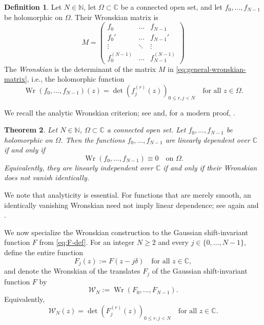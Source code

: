 \documentclass[11pt]{amsart}
\numberwithin{equation}{section}
\newtheorem{theorem}{Theorem}[section]
\theoremstyle{definition}
\newtheorem{definition}[theorem]{Definition}
\theoremstyle{remark}
\newcommand{\C}{\mathbb C}
\newcommand{\N}{\mathbb N}
\newcommand{\cW}{\mathcal W}
\newcommand{\Wr}{\operatorname{Wr}}
\begin{document}
\begin{definition}
    Let $N \in \N$, let $\Omega\subset\C$ be a connected open set, and let $f_0,\ldots,f_{N-1}$ be holomorphic on $\Omega$. Their Wronskian matrix is
    \begin{equation}\label{eq:general-wronskian-matrix}
        M = \begin{pmatrix}
            f_0 & \ldots & f_{N-1}\\
            f_0' & \ldots & f_{N-1}'\\
            \vdots & \ddots & \vdots\\
            f_0^{(N-1)} & \ldots & f_{N-1}^{(N-1)}
        \end{pmatrix}
    \end{equation}
    The \emph{Wronskian} is the determinant of the matrix $M$ in \eqref{eq:general-wronskian-matrix}, i.e., the holomorphic function
    \begin{equation}\label{eq:general-wronskian}
        \Wr(f_0,\ldots,f_{N-1})(z)
        =\det\left(f_j^{(r)}(z)\right)_{0\leq r,j<N}
        \quad\text{for all }z\in\Omega.
    \end{equation}
\end{definition}

We recall the analytic Wronskian criterion; see \cite[\S~4]{Bocher} and, for a modern proof, \cite{BostanDumas}.
\begin{theorem}\label{thm:wronskian-criterion}
    Let $N \in \N$, $\Omega\subset\C$ a connected open set. Let $f_0,\ldots,f_{N-1}$ be holomorphic on $\Omega$. Then the functions $f_0,\ldots,f_{N-1}$ are linearly dependent over $\C$ if and only if
    \begin{equation}
        \Wr(f_0,\ldots,f_{N-1})\equiv0
        \quad\text{on }\Omega.
    \end{equation}
    Equivalently, they are linearly independent over $\C$ if and only if their Wronskian does not vanish identically.
\end{theorem}
We note that analyticity is essential. For functions that are merely smooth, an identically vanishing Wronskian need not imply linear dependence; see again \cite[\S~4]{Bocher} and \cite{BostanDumas}.

We now specialize the Wronskian construction to the Gaussian shift-invariant function $F$ from \eqref{eq:F-def}. For an integer $N\geq2$ and every $j\in\{0,\ldots,N-1\}$, define the entire function
\begin{equation}\label{eq:F-translates}
    F_j(z):=F(z-j\delta)
    \quad\text{for all }z\in\C,
\end{equation}
and denote the Wronskian of the translates $F_j$ of the Gaussian shift-invariant function $F$ by
\begin{equation}\label{eq:wronskian}
    \cW_N:=\Wr(F_0,\ldots,F_{N-1}).
\end{equation}
Equivalently,
\begin{equation}
    \cW_N(z)=\det\left(F_j^{(r)}(z)\right)_{0\leq r,j<N}
    \quad\text{for all }z\in\C.
\end{equation}
\end{document}
